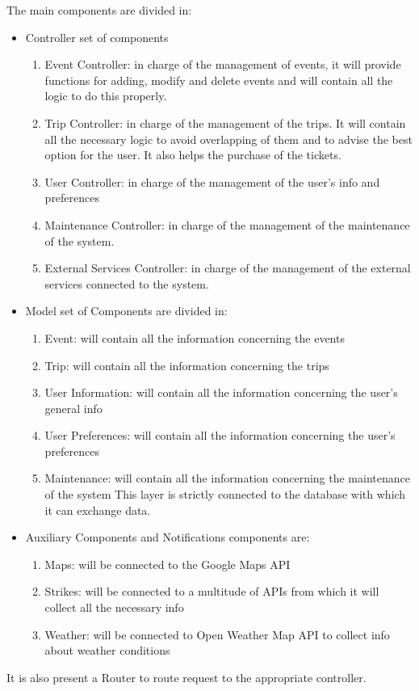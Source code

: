The main components are divided in:
\begin{itemize}

\item	Controller set of components
\begin{enumerate}
\item	Event Controller: in charge of the management of events, it will provide functions for adding, modify and delete events and will contain all the logic to do this properly.
\item	Trip Controller: in charge of the management of the trips. It will contain all the necessary logic to avoid overlapping of them and to advise the best option for the user. It also helps the purchase of the tickets.
\item	User Controller: in charge of the management of the user’s info and preferences
\item	Maintenance Controller: in charge of the management of the maintenance of the system.
\item	External Services Controller: in charge of the management of the external services connected to the system.
\end{enumerate}
\item	Model set of Components are divided in:
\begin{enumerate}

\item	Event: will contain all the information concerning the events
\item	Trip: will contain all the information concerning the trips
\item	User Information: will contain all the information concerning the user’s general info
\item	User Preferences: will contain all the information concerning the user’s preferences
\item	Maintenance: will contain all the information concerning the maintenance of the system
This layer is strictly connected to the database with which it can exchange data.
\end{enumerate}

\item	Auxiliary Components and Notifications components are:
\begin{enumerate}
\item	Maps: will be connected to the Google Maps API
\item	Strikes: will be connected to a multitude of APIs from which it will collect all the necessary info
\item	Weather: will be connected to Open Weather Map API to collect info about weather conditions
\end{enumerate}
\end{itemize}
It is also present a Router to route request to the appropriate controller.

